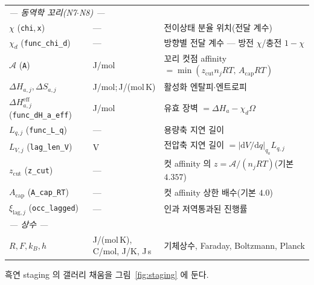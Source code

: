 \documentclass[11pt,a4paper]{article}
\newcommand{\dd}{\mathrm{d}}
\newcommand{\eff}{\mathrm{eff}}
\newcommand{\code}[1]{\texttt{#1}}
\begin{document}
\begin{longtable}{p{} p{} p{}}
\multicolumn{3}{l}{\emph{— 동역학 꼬리(N7$\cdot$N8) —}}\\
$\chi$ (\code{chi},\,\code{x}) & --- & 전이상태 분율 위치(전달 계수) \\
$\chi_d$ (\code{func\_chi\_d}) & --- & 방향별 전달 계수 — 방전 $\chi$/충전 $1-\chi$ \\
$\mathcal A$ (\code{A}) & J/mol & 꼬리 컷점 affinity $=\min(z_\mathrm{cut}n_jRT,\,A_\mathrm{cap}RT)$ \\
$\Delta H_{a,j},\Delta S_{a,j}$ & {\footnotesize J/mol;\,J/(mol\,K)} & 활성화 엔탈피$\cdot$엔트로피 \\
$\Delta H_{a,j}^\eff$ (\code{func\_dH\_a\_eff}) & J/mol & 유효 장벽 $=\Delta H_a-\chi_d\Omega$ \\
$L_{q,j}$ (\code{func\_L\_q}) & --- & 용량축 지연 길이 \\
$L_{V,j}$ (\code{lag\_len\_V}) & V & 전압축 지연 길이 $=|\dd V/\dd q|_{q_a}L_{q,j}$ \\
$z_\mathrm{cut}$ (\code{z\_cut}) & --- & 컷 affinity 의 $z=\mathcal A/(n_jRT)$(기본 $4.357$) \\
$A_\mathrm{cap}$ (\code{A\_cap\_RT}) & --- & 컷 affinity 상한 배수(기본 $4.0$) \\
$\xi_{\mathrm{lag},j}$ (\code{occ\_lagged}) & --- & 인과 저역통과된 진행률 \\
\multicolumn{3}{l}{\emph{— 상수 —}}\\
$R,F,k_B,h$ & {\footnotesize J/(mol\,K), C/mol, J/K, J\,s} & 기체상수, Faraday, Boltzmann, Planck \\
\bottomrule
\end{longtable}

흑연 staging 의 갤러리 채움을 그림~\ref{fig:staging} 에 둔다.
\end{document}

